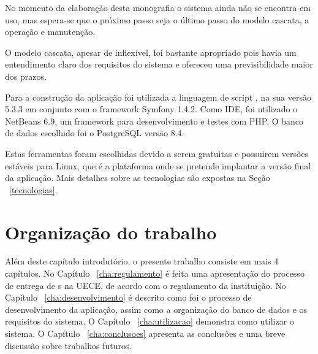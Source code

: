 No momento da elaboração desta monografia o sistema ainda não se encontra em uso,
mas espera-se que o próximo passo seja o último passo do modelo cascata, a operação
e manutenção.

O modelo cascata, apesar de inflexível, foi bastante apropriado pois havia um entendimento
claro dos requisitos do sistema e ofereceu uma previsibilidade maior dos prazos.

Para a construção da aplicação foi utilizada a linguagem de script , na 
sua versão 5.3.3 em conjunto com o framework Symfony 1.4.2. Como IDE, foi utilizado 
o NetBeans 6.9, um framework para desenvolvimento e testes com PHP. O 
banco de dados escolhido foi o PostgreSQL versão 8.4.

Estas ferramentas foram escolhidas devido a serem gratuitas e possuirem versões 
estáveis para Linux, que é a plataforma onde se pretende implantar a versão 
final da aplicação. Mais detalhes sobre as tecnologias são expostas na Seção ~\ref{tecnologias}.

\section{Organização do trabalho}

Além deste capítulo introdutório, o presente trabalho consiste em mais 4 capítulos. 
No Capítulo ~\ref{cha:regulamento} é feita uma apresentação do processo de 
entrega de s na UECE, de acordo
com o regulamento da instituição. No Capítulo ~\ref{cha:desenvolvimento} é descrito como foi o processo de desenvolvimento 
da aplicação, assim como a organização do banco de dados e os requisitos do sistema. 
O Capítulo ~\ref{cha:utilizacao} demonstra como utilizar o sistema. O Capítulo ~\ref{cha:conclusoes} apresenta as conclusões
e uma breve discussão sobre trabalhos futuros.

